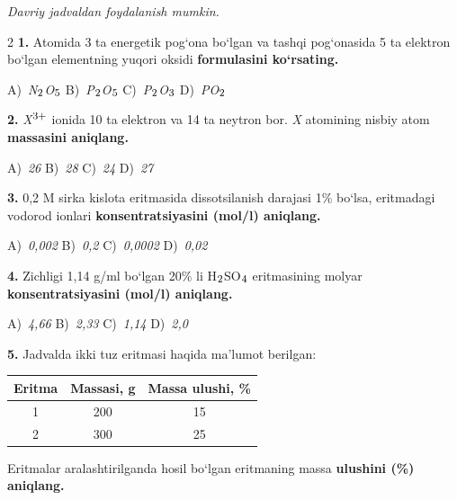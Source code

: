 \documentclass[11pt,a4paper]{article}
\renewcommand{\normalsize}{\fontsize{10.9}{13.4}\selectfont}
\renewcommand{\textsubscript}[1]{\ensuremath{_{\text{\fontsize{8}{8}\selectfont #1}}}}
\renewcommand{\textsuperscript}[1]{\ensuremath{^{\text{\fontsize{8}{8}\selectfont #1}}}}
\begin{document}
\normalsize
\thispagestyle{first}
\noindent{}
\par\medskip
\noindent\textit{Davriy jadvaldan foydalanish mumkin.}
\par\medskip
\begin{multicols}{2}
\noindent\textbf{1.} Atomida 3 ta energetik pog`ona bo`lgan va tashqi pog`onasida 5 ta elektron bo`lgan elementning yuqori oksidi \textbf{formulasini ko`rsating.}

\noindent A)~\textsl{N\textsubscript{2}O\textsubscript{5}} \hfill B)~\textsl{P\textsubscript{2}O\textsubscript{5}} \hfill C)~\textsl{P\textsubscript{2}O\textsubscript{3}} \hfill D)~\textsl{PO\textsubscript{2}}\par
\vspace{4pt}
\noindent\textbf{2.} \textit{X}\textsuperscript{3+} ionida 10 ta elektron va 14 ta neytron bor. \textit{X} atomining nisbiy atom \textbf{massasini aniqlang.}

\noindent A)~\textsl{26} \hfill B)~\textsl{28} \hfill C)~\textsl{24} \hfill D)~\textsl{27}\par
\vspace{4pt}
\noindent\textbf{3.} 0,2 M sirka kislota eritmasida dissotsilanish darajasi 1\% bo`lsa, eritmadagi vodorod ionlari \textbf{konsentratsiyasini (mol/l) aniqlang.}

\noindent A)~\textsl{0,002} \hfill B)~\textsl{0,2} \hfill C)~\textsl{0,0002} \hfill D)~\textsl{0,02}\par
\vspace{4pt}
\noindent\textbf{4.} Zichligi 1,14 g/ml bo`lgan 20\% li H\textsubscript{2}SO\textsubscript{4} eritmasining molyar \textbf{konsentratsiyasini (mol/l) aniqlang.}

\noindent A)~\textsl{4,66} \hfill B)~\textsl{2,33} \hfill C)~\textsl{1,14} \hfill D)~\textsl{2,0}\par
\vspace{4pt}
\noindent\textbf{5.} Jadvalda ikki tuz eritmasi haqida ma'lumot berilgan:
\begin{center}
\renewcommand{\arraystretch}{1.15}
\begin{tabular}{|c|c|c|}\hline
\textbf{Eritma} & \textbf{Massasi, g} & \textbf{Massa ulushi, \%} \\ \hline
1 & 200 & 15 \\ \hline
2 & 300 & 25 \\ \hline
\end{tabular}
\end{center}
Eritmalar aralashtirilganda hosil bo`lgan eritmaning massa \textbf{ulushini (\%) aniqlang.}


\end{multicols}
\end{document}
